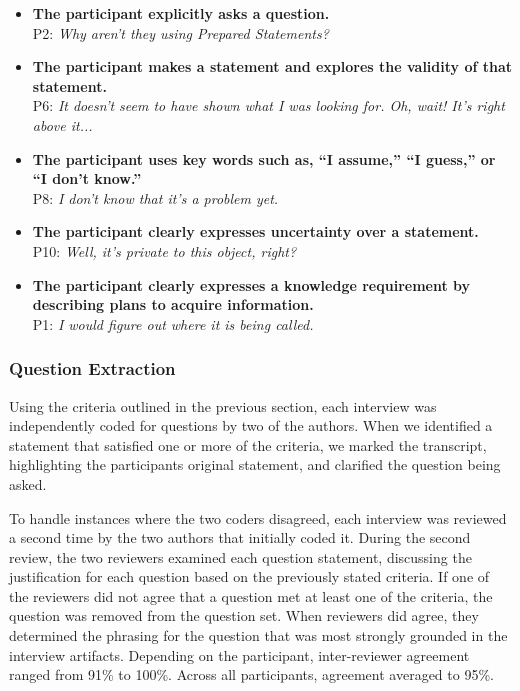 \documentclass[conference]{IEEEtran}
\begin{document}
\begin{itemize}
\item \textbf{The participant explicitly asks a question.}
\\ P2: \textit{Why aren't they using Prepared Statements?}
\item \textbf{The participant makes a statement and explores the validity of that statement.}
\\ P6: \textit{It doesn't seem to have shown what I was looking for. Oh, wait! It's right above it...}
\item \textbf{The participant uses key words such as, ``I assume,'' ``I guess,'' or ``I don't know.''}
\\ P8: \textit{I don't know that it's a problem yet.}
\item \textbf{The participant clearly expresses uncertainty over a statement.}
\\ P10: \textit{Well, it's private to this object, right?}
\item \textbf{The participant clearly expresses a knowledge requirement by describing plans to acquire information.}
\\ P1: \textit{I would figure out where it is being called.}

\end{itemize}

\subsubsection{Question Extraction}
Using the criteria outlined in the previous section, each interview was independently coded for questions by two of the authors. 
When we identified a statement that satisfied one or more of the criteria, we marked the transcript, highlighting the participants original statement, and clarified the question being asked.

To handle instances where the two coders disagreed, each interview was reviewed a second time by the two authors that initially coded it.
During the second review, the two reviewers examined each question statement, discussing the justification for each question based on the previously stated criteria.
If one of the reviewers did not agree that a question met at least one of the criteria, the question was removed from the question set. 
When reviewers did agree, they determined the phrasing for the question that was most strongly grounded in the interview artifacts. 
Depending on the participant, inter-reviewer agreement ranged from 91\% to 100\%. Across all participants, agreement averaged to 95\%.
\end{document}
